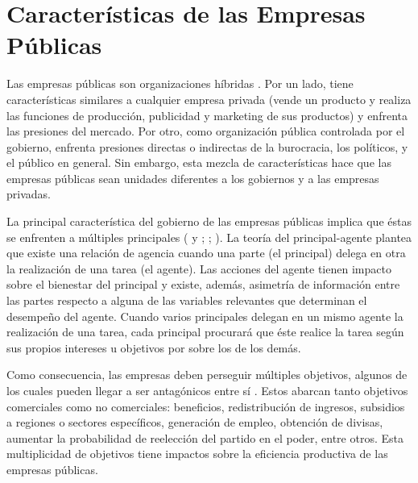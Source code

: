 \documentclass[
  12pt,
  spanish,
]{book}
\begin{document}
\hypertarget{caracteruxedsticas-de-las-empresas-puxfablicas}{%
\section{Características de las Empresas
Públicas}\label{caracteruxedsticas-de-las-empresas-puxfablicas}}

Las empresas públicas son organizaciones híbridas \citep{Jones1982}. Por
un lado, tiene características similares a cualquier empresa privada
(vende un producto y realiza las funciones de producción, publicidad y
marketing de sus productos) y enfrenta las presiones del mercado. Por
otro, como organización pública controlada por el gobierno, enfrenta
presiones directas o indirectas de la burocracia, los políticos, y el
público en general. Sin embargo, esta mezcla de características hace que
las empresas públicas sean unidades diferentes a los gobiernos y a las
empresas privadas.

La principal característica del gobierno de las empresas públicas
implica que éstas se enfrenten a múltiples principales
(\citet{Dixit1998} y \citet{Dixit1997}; \citet{Martimort1996};
\citet{Tirole1994}). La teoría del principal-agente plantea que existe
una relación de agencia cuando una parte (el principal) delega en otra
la realización de una tarea (el agente). Las acciones del agente tienen
impacto sobre el bienestar del principal y existe, además, asimetría de
información entre las partes respecto a alguna de las variables
relevantes que determinan el desempeño del agente. Cuando varios
principales delegan en un mismo agente la realización de una tarea, cada
principal procurará que éste realice la tarea según sus propios
intereses u objetivos por sobre los de los demás.

Como consecuencia, las empresas deben perseguir múltiples objetivos,
algunos de los cuales pueden llegar a ser antagónicos entre sí
\citep{Tirole1994}. Estos abarcan tanto objetivos comerciales como no
comerciales: beneficios, redistribución de ingresos, subsidios a
regiones o sectores específicos, generación de empleo, obtención de
divisas, aumentar la probabilidad de reelección del partido en el poder,
entre otros. Esta multiplicidad de objetivos tiene impactos sobre la
eficiencia productiva de las empresas públicas.
\end{document}

